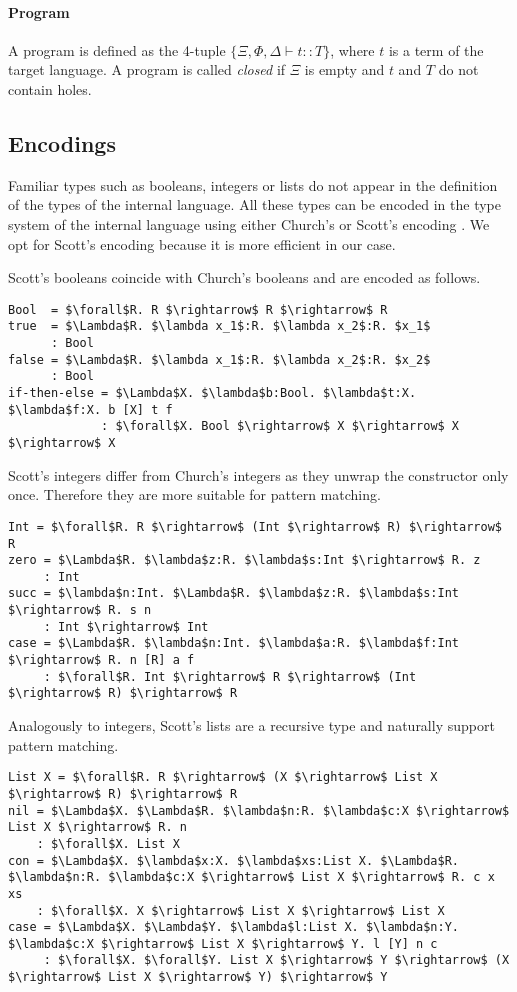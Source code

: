 \paragraph{Program} A program is defined as the 4-tuple $\{\Xi, \Phi, \Delta \vdash t :: T\}$, where $t$ is a term of the target language. A program is called \emph{closed} if $\Xi$ is empty and $t$ and $T$ do not contain holes.


  \subsection{Encodings}\label{Encodings}
Familiar types such as booleans, integers or lists do not appear in the definition of the types of the internal language. All these types can be encoded in the type system of the internal language using either Church's or Scott's encoding \cite{ScottNumerals}. We opt for Scott's encoding because it is more efficient in our case.

Scott's booleans coincide with Church's booleans and are encoded as follows.
\begin{lstlisting}[style=plain, mathescape]
Bool  = $\forall$R. R $\rightarrow$ R $\rightarrow$ R
true  = $\Lambda$R. $\lambda x_1$:R. $\lambda x_2$:R. $x_1$
      : Bool
false = $\Lambda$R. $\lambda x_1$:R. $\lambda x_2$:R. $x_2$
      : Bool
if-then-else = $\Lambda$X. $\lambda$b:Bool. $\lambda$t:X. $\lambda$f:X. b [X] t f
             : $\forall$X. Bool $\rightarrow$ X $\rightarrow$ X $\rightarrow$ X
\end{lstlisting}

Scott's integers differ from Church's integers as they unwrap the constructor only once. Therefore they are more suitable for pattern matching.
\begin{lstlisting}[style=plain, mathescape]
Int = $\forall$R. R $\rightarrow$ (Int $\rightarrow$ R) $\rightarrow$ R
zero = $\Lambda$R. $\lambda$z:R. $\lambda$s:Int $\rightarrow$ R. z
     : Int
succ = $\lambda$n:Int. $\Lambda$R. $\lambda$z:R. $\lambda$s:Int $\rightarrow$ R. s n
     : Int $\rightarrow$ Int
case = $\Lambda$R. $\lambda$n:Int. $\lambda$a:R. $\lambda$f:Int $\rightarrow$ R. n [R] a f
     : $\forall$R. Int $\rightarrow$ R $\rightarrow$ (Int $\rightarrow$ R) $\rightarrow$ R
\end{lstlisting}

Analogously to integers, Scott's lists are a recursive type and naturally support pattern matching.
\begin{lstlisting}[style=plain, mathescape]
List X = $\forall$R. R $\rightarrow$ (X $\rightarrow$ List X $\rightarrow$ R) $\rightarrow$ R
nil = $\Lambda$X. $\Lambda$R. $\lambda$n:R. $\lambda$c:X $\rightarrow$ List X $\rightarrow$ R. n
    : $\forall$X. List X
con = $\Lambda$X. $\lambda$x:X. $\lambda$xs:List X. $\Lambda$R. $\lambda$n:R. $\lambda$c:X $\rightarrow$ List X $\rightarrow$ R. c x xs
    : $\forall$X. X $\rightarrow$ List X $\rightarrow$ List X
case = $\Lambda$X. $\Lambda$Y. $\lambda$l:List X. $\lambda$n:Y. $\lambda$c:X $\rightarrow$ List X $\rightarrow$ Y. l [Y] n c
     : $\forall$X. $\forall$Y. List X $\rightarrow$ Y $\rightarrow$ (X $\rightarrow$ List X $\rightarrow$ Y) $\rightarrow$ Y
\end{lstlisting} 

